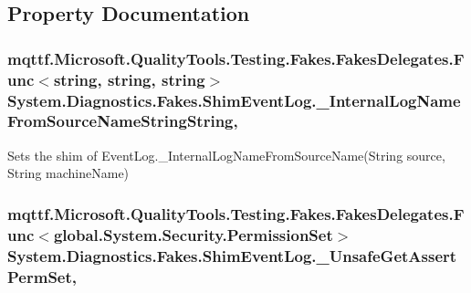 \subsection{Property Documentation}
\hypertarget{class_system_1_1_diagnostics_1_1_fakes_1_1_shim_event_log_a2b8467ef0d737cbcff2853dad8894be4}{
\subsubsection[{\-\_\-\-Internal\-Log\-Name\-From\-Source\-Name\-String\-String}]{\setlength{\rightskip}{0pt plus 5cm}mqttf.\-Microsoft.\-Quality\-Tools.\-Testing.\-Fakes.\-Fakes\-Delegates.\-Func$<$string, string, string$>$ System.\-Diagnostics.\-Fakes.\-Shim\-Event\-Log.\-\_\-\-Internal\-Log\-Name\-From\-Source\-Name\-String\-String\hspace{0.3cm}{\ttfamily [static]}, {\ttfamily [set]}}}\label{class_system_1_1_diagnostics_1_1_fakes_1_1_shim_event_log_a2b8467ef0d737cbcff2853dad8894be4}


Sets the shim of Event\-Log.\-\_\-\-Internal\-Log\-Name\-From\-Source\-Name(\-String source, String machine\-Name)

\hypertarget{class_system_1_1_diagnostics_1_1_fakes_1_1_shim_event_log_ac2bb91d99628985b1e1d6b4f70965387}{
\subsubsection[{\-\_\-\-Unsafe\-Get\-Assert\-Perm\-Set}]{\setlength{\rightskip}{0pt plus 5cm}mqttf.\-Microsoft.\-Quality\-Tools.\-Testing.\-Fakes.\-Fakes\-Delegates.\-Func$<$global.\-System.\-Security.\-Permission\-Set$>$ System.\-Diagnostics.\-Fakes.\-Shim\-Event\-Log.\-\_\-\-Unsafe\-Get\-Assert\-Perm\-Set\hspace{0.3cm}{\ttfamily [static]}, {\ttfamily [set]}}}\label{class_system_1_1_diagnostics_1_1_fakes_1_1_shim_event_log_ac2bb91d99628985b1e1d6b4f70965387}


